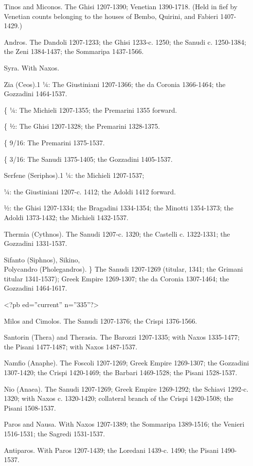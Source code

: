 Tinos and Miconos.
The Ghisi 1207-1390; Venetian 1390-1718. (Held in fief by Venetian counts belonging to the houses of Bembo, Quirini, and Fabieri 1407-1429.)

Andros.
The Dandoli 1207-1233; the Ghisi 1233-c. 1250; the Sanudi c. 1250-1384; the Zeni 1384-1437; the Sommaripa 1437-1566.

Syra.
With Naxos.

Zia (Ceos).1
¼: The Giustiniani 1207-1366; the da Coronia 1366-1464; the Gozzadini 1464-1537.

\{ ¼: The Michieli 1207-1355; the Premarini 1355 forward.

\{ ½: The Ghisi 1207-1328; the Premarini 1328-1375.

\{ 9/16: The Premarini 1375-1537.

\{ 3/16: The Sanudi 1375-1405; the Gozzadini 1405-1537.

Serfene (Seriphos).1
¼: the Michieli 1207-1537;

¼: the Giustiniani 1207-c. 1412; the Adoldi 1412 forward.

½: the Ghisi 1207-1334; the Bragadini 1334-1354; the Minotti 1354-1373; the Adoldi 1373-1432; the Michieli 1432-1537.

Thermia (Cythnos).
The Sanudi 1207-c. 1320; the Castelli c. 1322-1331; the Gozzadini 1331-1537.

Sifanto (Siphnos), Sikino, \\
Polycandro (Pholegandros). \}
The Sanudi 1207-1269 (titular, 1341; the Grimani titular 1341-1537); Greek Empire 1269-1307; the da Coronia 1307-1464; the Gozzadini 1464-1617.

<?pb ed=''current'' n=''335''?>

Milos and Cimolos.
The Sanudi 1207-1376; the Crispi 1376-1566.

Santorin (Thera) and Therasia.
The Barozzi 1207-1335; with Naxos 1335-1477; the Pisani 1477-1487; with Naxos 1487-1537.

Namfio (Anaphe).
The Foscoli 1207-1269; Greek Empire 1269-1307; the Gozzadini 1307-1420; the Crispi 1420-1469; the Barbari 1469-1528; the Pisani 1528-1537.

Nio (Anaea).
The Sanudi 1207-1269; Greek Empire 1269-1292; the Schiavi 1292-c. 1320; with Naxos c. 1320-1420; collateral branch of the Crispi 1420-1508; the Pisani 1508-1537.

Paros and Nausa.
With Naxos 1207-1389; the Sommaripa 1389-1516; the Venieri 1516-1531; the Sagredi 1531-1537.

Antiparos.
With Paros 1207-1439; the Loredani 1439-c. 1490; the Pisani 1490-1537.

